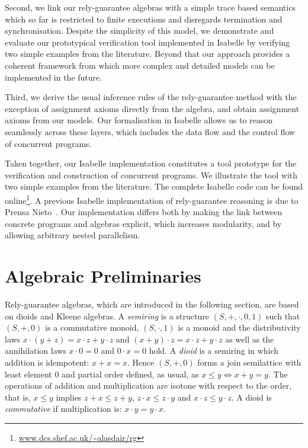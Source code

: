 \documentclass{llncs}
\begin{document}
Second, we link our rely-guarantee algebras with a simple trace based
semantics which so far is restricted to finite executions and
disregards termination and synchronisation. Despite the simplicity of
this model, we demonstrate and evaluate our prototypical verification
tool implemented in Isabelle by verifying two simple examples from
the literature. Beyond that our approach provides a coherent framework
from which more complex and detailed models can be implemented in the
future.

Third, we derive the usual inference rules of the rely-guarantee
method with the exception of assignment axioms directly from the
algebra, and obtain assignment axioms from our models. Our
formalisation in Isabelle allows us to reason seamlessly across these
layers, which includes the data flow and the control flow of concurrent
programs.

Taken together, our Isabelle implementation constitutes a tool
prototype for the verification and construction of concurrent
programs. We illustrate the tool with two simple examples from the
literature. The complete Isabelle code can be found
online\footnote{\url{www.dcs.shef.ac.uk/~alasdair/rg}}. A
previous Isabelle implementation of rely-guarantee reasoning is due to
Prensa Nieto~\cite{nieto_rely-guarantee_2003}. Our implementation
differs both by making the link between concrete programs and algebras
explicit, which increases modularity, and by allowing arbitrary nested parallelism.

\section{Algebraic Preliminaries}
\label{sec:KA}

Rely-guarantee algebras, which are introduced in the following
section, are based on dioids and Kleene algebras. A \emph{semiring} is
a structure $(S,+,\cdot,0,1)$ such that $(S,+,0)$ is a commutative
monoid, $(S,\cdot, 1)$ is a monoid and the distributivity laws $x\cdot
(y+z)=x\cdot z + y \cdot z$ and $(x+y)\cdot z = x\cdot z+y\cdot z$ as
well as the annihilation laws $x\cdot 0=0$ and $0\cdot x=0$ hold. A
\emph{dioid} is a semiring in which addition is idempotent:
$x+x=x$. Hence $(S,+,0)$ forms a join semilattice with least element
$0$ and partial order defined, as usual, as $x\le y\Leftrightarrow
x+y=y$. The operations of addition and multiplication are isotone with
respect to the order, that is, $x \le y $ implies $z+x\le z+y$,
$z\cdot x \le z\cdot y$ and $x\cdot z \le y\cdot z$. A dioid is
\emph{commutative} if multiplication is: $x\cdot y = y \cdot x$.
\end{document}
